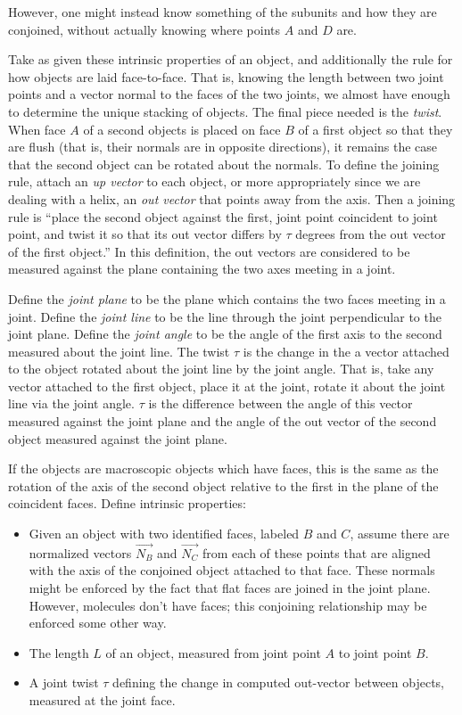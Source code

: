 \documentclass{svproc}
\begin{document}
However, one might instead know something of the subunits and
how they are conjoined, without actually knowing where points $A$
and $D$ are.

Take as given these intrinsic properties of an object, and additionally the
rule for how objects are laid face-to-face. That is, knowing the length between two
joint points and a vector normal to the faces of the two joints, we almost have
enough to determine the unique stacking of objects. The final piece
needed is
the {\em twist}. When face $A$ of a second objects is placed on face $B$
of a first object so that they are flush (that is, their normals are in opposite directions),
it remains the case that the second object can be rotated about the normals. To
define the joining rule, attach an {\em up vector} to each object, or more appropriately
since we are dealing with a helix, an {\em out vector} that points away from the axis.
Then a joining
rule is ``place the second object against the first, joint point coincident to joint point,
and twist it so that its out vector differs by $\tau$ degrees from the out vector of the first
object.'' In this definition, the out vectors are considered to be measured against the plane
containing the two axes meeting in a joint.

Define the {\em joint plane} to be the plane which contains the two faces meeting in a joint.
Define the {\em joint line} to be the line through the joint perpendicular to the joint plane.
Define the {\em joint angle} to be the angle of the first axis to the second measured about
the joint line.
The twist $\tau$ is the change in the a vector attached to the object rotated about the joint
line by the joint angle. That is, take any vector attached to the first object, place it at
the joint, rotate it about the joint line via the joint angle. $\tau$ is the difference
between the angle of this vector measured against the joint plane and the angle of the
out vector of the second object measured against the joint plane.

If the objects are macroscopic objects which have faces, this is the same as the rotation
of the axis of the second object relative to the first in the plane of the coincident faces.
Define intrinsic properties:

\begin{itemize}
\item Given an object with two identified faces, labeled $B$ and $C$, assume there are normalized
  vectors $\overrightarrow{N_B}$ and $\overrightarrow{N_C}$
  from each of these points that are aligned with the axis of the conjoined object attached to
  that face. These normals might be enforced by the fact that flat faces are joined in the joint plane.
  However, molecules don't have faces; this conjoining relationship may be enforced some other way.
\item The length $L$ of an object, measured from joint point $A$ to joint point $B$.
\item A joint twist $\tau$ defining the change in computed out-vector between objects,
  measured at the joint face.
\end{itemize}
\end{document}
